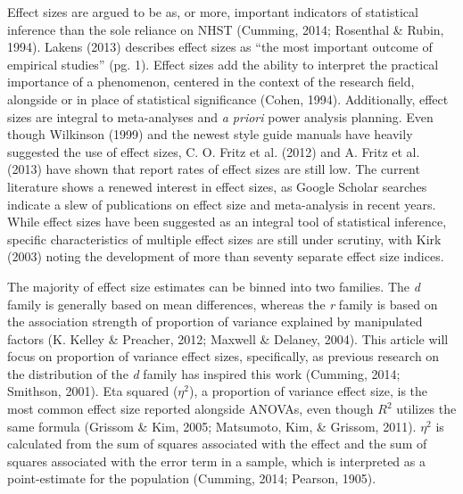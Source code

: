 \documentclass[english,man]{apa6}
\theoremstyle{definition}
\theoremstyle{definition}
\theoremstyle{definition}
\theoremstyle{remark}
\begin{document}
Effect sizes are argued to be as, or more, important indicators of
statistical inference than the sole reliance on NHST (Cumming, 2014;
Rosenthal \& Rubin, 1994). Lakens (2013) describes effect sizes as
\enquote{the most important outcome of empirical studies} (pg. 1).
Effect sizes add the ability to interpret the practical importance of a
phenomenon, centered in the context of the research field, alongside or
in place of statistical significance (Cohen, 1994). Additionally, effect
sizes are integral to meta-analyses and \emph{a priori} power analysis
planning. Even though Wilkinson (1999) and the newest style guide
manuals have heavily suggested the use of effect sizes, C. O. Fritz et
al. (2012) and A. Fritz et al. (2013) have shown that report rates of
effect sizes are still low. The current literature shows a renewed
interest in effect sizes, as Google Scholar searches indicate a slew of
publications on effect size and meta-analysis in recent years. While
effect sizes have been suggested as an integral tool of statistical
inference, specific characteristics of multiple effect sizes are still
under scrutiny, with Kirk (2003) noting the development of more than
seventy separate effect size indices.

The majority of effect size estimates can be binned into two families.
The \emph{d} family is generally based on mean differences, whereas the
\emph{r} family is based on the association strength of proportion of
variance explained by manipulated factors (K. Kelley \& Preacher, 2012;
Maxwell \& Delaney, 2004). This article will focus on proportion of
variance effect sizes, specifically, as previous research on the
distribution of the \emph{d} family has inspired this work (Cumming,
2014; Smithson, 2001). Eta squared (\(\eta^2\)), a proportion of
variance effect size, is the most common effect size reported alongside
ANOVAs, even though \(R^2\) utilizes the same formula (Grissom \& Kim,
2005; Matsumoto, Kim, \& Grissom, 2011). \(\eta^2\) is calculated from
the sum of squares associated with the effect and the sum of squares
associated with the error term in a sample, which is interpreted as a
point-estimate for the population (Cumming, 2014; Pearson, 1905).
\end{document}
